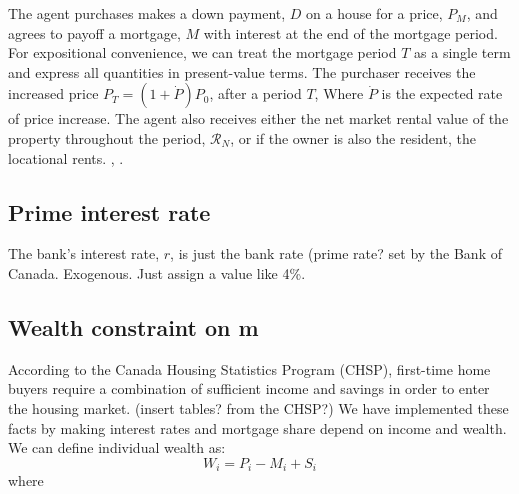 

    
 The agent purchases makes a down payment, $D$ on a house for a price, $P_M$, and agrees to payoff a mortgage, $M$ with interest at the end of the mortgage period. For expositional convenience, we can treat the mortgage period $T$ as a single term and express all quantities  in present-value terms. The purchaser 
 receives the increased price $P_T = (1 + \dot P)P_0$,  after a period $T$, Where $\dot P$ is the expected rate of price increase. The agent also receives either the net market rental value of the property throughout the period, $\mathcal{R}_N$, or if the owner is also the resident, the locational rents.
\cite{anselinModernSpatialEconometrics2014}, \cite{gelmanDataAnalysisUsing2006}.

\subsection{Prime interest rate}\label{SS:BankRate}

The bank's interest rate, $r$, is just the bank rate (prime rate? set by the Bank of Canada. Exogenous. Just assign  a value like 4\%.

\subsection{Wealth constraint on m} \label{SS:WealthConstraint}

According to the Canada Housing Statistics Program (CHSP), first-time home buyers require a combination of sufficient income and savings in order to enter the housing market. (insert tables? from the CHSP?) We have implemented these facts by making interest rates and mortgage share depend on income and wealth.
We can define individual wealth as:
\[W_i= P_i -M_i  +S_i\]
where 

